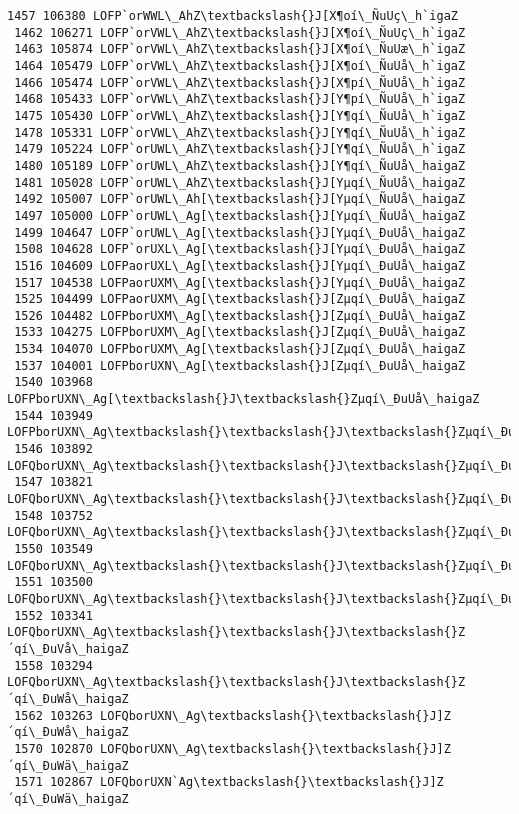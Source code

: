 \documentclass[11pt]{article}
\begin{document}
\begin{Verbatim}[commandchars=\\\{\}]
 1457 106380 LOFP`orWWL\_AhZ\textbackslash{}J[X¶oí\_ÑuUç\_h`igaZ
 1462 106271 LOFP`orVWL\_AhZ\textbackslash{}J[X¶oí\_ÑuUç\_h`igaZ
 1463 105874 LOFP`orVWL\_AhZ\textbackslash{}J[X¶oí\_ÑuUæ\_h`igaZ
 1464 105479 LOFP`orVWL\_AhZ\textbackslash{}J[X¶oí\_ÑuUå\_h`igaZ
 1466 105474 LOFP`orVWL\_AhZ\textbackslash{}J[X¶pí\_ÑuUå\_h`igaZ
 1468 105433 LOFP`orVWL\_AhZ\textbackslash{}J[Y¶pí\_ÑuUå\_h`igaZ
 1475 105430 LOFP`orVWL\_AhZ\textbackslash{}J[Y¶qí\_ÑuUå\_h`igaZ
 1478 105331 LOFP`orVWL\_AhZ\textbackslash{}J[Y¶qí\_ÑuUå\_h`igaZ
 1479 105224 LOFP`orUWL\_AhZ\textbackslash{}J[Y¶qí\_ÑuUå\_h`igaZ
 1480 105189 LOFP`orUWL\_AhZ\textbackslash{}J[Y¶qí\_ÑuUå\_haigaZ
 1481 105028 LOFP`orUWL\_AhZ\textbackslash{}J[Yµqí\_ÑuUå\_haigaZ
 1492 105007 LOFP`orUWL\_Ah[\textbackslash{}J[Yµqí\_ÑuUå\_haigaZ
 1497 105000 LOFP`orUWL\_Ag[\textbackslash{}J[Yµqí\_ÑuUå\_haigaZ
 1499 104647 LOFP`orUWL\_Ag[\textbackslash{}J[Yµqí\_ÐuUå\_haigaZ
 1508 104628 LOFP`orUXL\_Ag[\textbackslash{}J[Yµqí\_ÐuUå\_haigaZ
 1516 104609 LOFPaorUXL\_Ag[\textbackslash{}J[Yµqí\_ÐuUå\_haigaZ
 1517 104538 LOFPaorUXM\_Ag[\textbackslash{}J[Yµqí\_ÐuUå\_haigaZ
 1525 104499 LOFPaorUXM\_Ag[\textbackslash{}J[Zµqí\_ÐuUå\_haigaZ
 1526 104482 LOFPborUXM\_Ag[\textbackslash{}J[Zµqí\_ÐuUå\_haigaZ
 1533 104275 LOFPborUXM\_Ag[\textbackslash{}J[Zµqí\_ÐuUå\_haigaZ
 1534 104070 LOFPborUXM\_Ag[\textbackslash{}J[Zµqí\_ÐuUå\_haigaZ
 1537 104001 LOFPborUXN\_Ag[\textbackslash{}J[Zµqí\_ÐuUå\_haigaZ
 1540 103968 LOFPborUXN\_Ag[\textbackslash{}J\textbackslash{}Zµqí\_ÐuUå\_haigaZ
 1544 103949 LOFPborUXN\_Ag\textbackslash{}\textbackslash{}J\textbackslash{}Zµqí\_ÐuUå\_haigaZ
 1546 103892 LOFQborUXN\_Ag\textbackslash{}\textbackslash{}J\textbackslash{}Zµqí\_ÐuUå\_haigaZ
 1547 103821 LOFQborUXN\_Ag\textbackslash{}\textbackslash{}J\textbackslash{}Zµqí\_ÐuUå\_haigaZ
 1548 103752 LOFQborUXN\_Ag\textbackslash{}\textbackslash{}J\textbackslash{}Zµqí\_ÐuUå\_haigaZ
 1550 103549 LOFQborUXN\_Ag\textbackslash{}\textbackslash{}J\textbackslash{}Zµqí\_ÐuUå\_haigaZ
 1551 103500 LOFQborUXN\_Ag\textbackslash{}\textbackslash{}J\textbackslash{}Zµqí\_ÐuVå\_haigaZ
 1552 103341 LOFQborUXN\_Ag\textbackslash{}\textbackslash{}J\textbackslash{}Z´qí\_ÐuVå\_haigaZ
 1558 103294 LOFQborUXN\_Ag\textbackslash{}\textbackslash{}J\textbackslash{}Z´qí\_ÐuWå\_haigaZ
 1562 103263 LOFQborUXN\_Ag\textbackslash{}\textbackslash{}J]Z´qí\_ÐuWå\_haigaZ
 1570 102870 LOFQborUXN\_Ag\textbackslash{}\textbackslash{}J]Z´qí\_ÐuWä\_haigaZ
 1571 102867 LOFQborUXN`Ag\textbackslash{}\textbackslash{}J]Z´qí\_ÐuWä\_haigaZ

\end{Verbatim}
\end{document}
